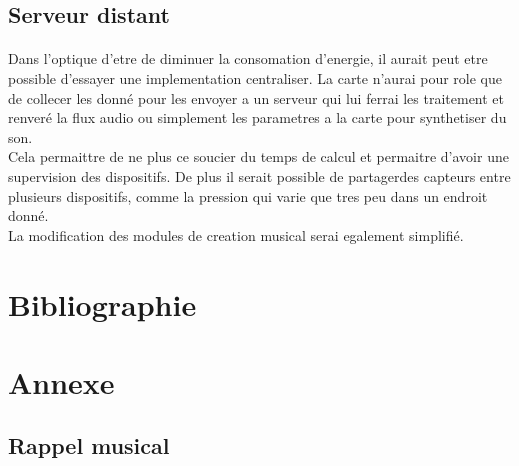 \documentclass[a4paper, titlepage, oneside, 12pt]{article}%
\begin{document}
\subsection{Serveur distant}
\paragraph{}
Dans l'optique d'etre de diminuer la consomation d'energie, il aurait peut etre possible d'essayer une implementation centraliser. La carte n'aurai pour role que de collecer les donné pour les envoyer a un serveur qui lui ferrai les traitement et renveré la flux audio ou simplement les parametres a la carte pour synthetiser du son.\\
Cela permaittre de ne plus ce soucier du temps de calcul et permaitre d'avoir une supervision des dispositifs. De plus il serait possible de partagerdes capteurs entre plusieurs dispositifs, comme la pression qui varie que tres peu dans un endroit donné.\\
La modification des modules de creation musical serai egalement simplifié.
 

\newpage
\section{Bibliographie}
\nocite{*}



\newpage\section{Annexe}
\subsection{Rappel musical}
\end{document}

